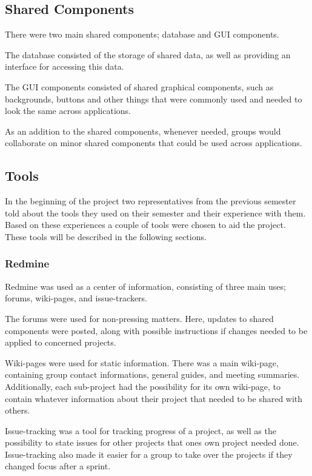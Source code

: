\subsection{Shared Components}\label{multiproject:sharedcomponents}
There were two main shared components; database and GUI components.

The database consisted of the storage of shared data, as well as providing an interface for accessing this data.

The GUI components consisted of shared graphical components, such as backgrounds, buttons and other things that were commonly used and needed to look the same across applications.

As an addition to the shared components, whenever needed, groups would collaborate on minor shared components that could be used across applications.

\subsection{Tools}
In the beginning of the project two representatives from the previous semester told about the tools they used on their semester and their experience with them.
Based on these experiences a couple of tools were chosen to aid the project.
These tools will be described in the following sections.

\subsubsection{Redmine}
Redmine was used as a center of information, consisting of three main uses; forums, wiki-pages, and issue-trackers.

The forums were used for non-pressing matters.
Here, updates to shared components were posted, along with possible instructions if changes needed to be applied to concerned projects.

Wiki-pages were used for static information.
There was a main wiki-page, containing group contact informations, general guides, and meeting summaries.
Additionally, each sub-project had the possibility for its own wiki-page, to contain whatever information about their project that needed to be shared with others.

Issue-tracking was a tool for tracking progress of a project, as well as the possibility to state issues for other projects that ones own project needed done.
Issue-tracking also made it easier for a group to take over the projects if they changed focus after a sprint.

